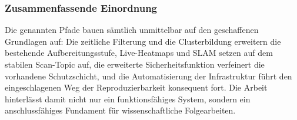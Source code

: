\subsubsection{Zusammenfassende Einordnung}
Die genannten Pfade bauen sämtlich unmittelbar auf den geschaffenen Grundlagen auf: Die zeitliche Filterung und die Clusterbildung erweitern die bestehende Aufbereitungsstufe, Live-Heatmaps und SLAM setzen auf dem stabilen Scan-Topic auf, die erweiterte Sicherheitsfunktion verfeinert die vorhandene Schutzschicht, und die Automatisierung der Infrastruktur führt den eingeschlagenen Weg der Reproduzierbarkeit konsequent fort. Die Arbeit hinterlässt damit nicht nur ein funktionsfähiges System, sondern ein anschlussfähiges Fundament für wissenschaftliche Folgearbeiten.
